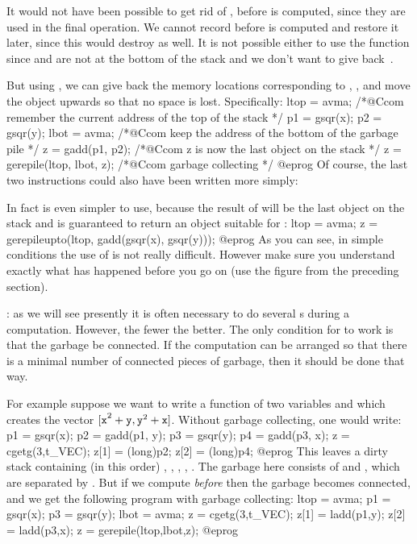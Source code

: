 It would not have been possible to get rid of ,  before
 is computed, since they are used in the final operation. We cannot
record  before  is computed and restore it later, since
this would destroy  as well. It is not possible either to use the
function  since  and  are not at the bottom of the
stack and we don't want to give back~.

But using , we can give back the memory locations corresponding
to , , and move the object  upwards so that no
space is lost. Specifically:
\bprog
  ltop = avma; /*@Ccom remember the current address of the top of the stack */
  p1 = gsqr(x); p2 = gsqr(y);
  lbot = avma; /*@Ccom keep the address of the bottom of the garbage pile */
  z = gadd(p1, p2); /*@Ccom z is now the last object on the stack */
  z = gerepile(ltop, lbot, z); /*@Ccom garbage collecting */
@eprog
\noindent Of course, the last two instructions could also have been
written more simply:


\noindent In fact  is even simpler to use, because the
result of  will be the last object on the stack and  is
guaranteed to return an object suitable for :
\bprog
  ltop = avma;
  z = gerepileupto(ltop, gadd(gsqr(x), gsqr(y)));
@eprog
\noindent
As you can see, in simple conditions the use of  is not really
difficult. However make sure you understand exactly what has happened before
you go on (use the figure from the preceding section).

: as we will see presently it is often
necessary to do several s during a computation. However, the
fewer the better. The only condition for  to work is that the
garbage be connected. If the computation can be arranged so that there is a
minimal number of connected pieces of garbage, then it should be done that
way.

For example suppose we want to write a function of two  variables
 and  which creates the vector ${\tt [x}^2+{\tt y},
{\tt y}^2+{\tt x]}$. Without garbage collecting, one would write:
%
\bprog
  p1 = gsqr(x); p2 = gadd(p1, y);
  p3 = gsqr(y); p4 = gadd(p3, x);
  z = cgetg(3,t_VEC);
  z[1] = (long)p2;
  z[2] = (long)p4;
@eprog
\noindent
This leaves a dirty stack containing (in this order) , ,
, , . The garbage here consists of  and
, which are separated by . But if we compute 
\emph{before}  then the garbage becomes connected, and we get the
following program with garbage collecting:
%
\bprog
  ltop = avma; p1 = gsqr(x); p3 = gsqr(y); lbot = avma;
  z = cgetg(3,t_VEC);
  z[1] = ladd(p1,y);
  z[2] = ladd(p3,x);
  z = gerepile(ltop,lbot,z);
@eprog

